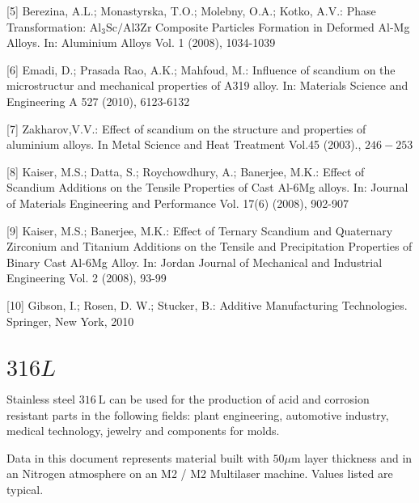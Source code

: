 \documentclass[10pt]{article}
\begin{document}
[5] Berezina, A.L.; Monastyrska, T.O.; Molebny, O.A.; Kotko, A.V.: Phase Transformation: $\mathrm{Al}_{3} \mathrm{Sc} / \mathrm{Al3Zr}$ Composite Particles Formation in Deformed Al-Mg Alloys. In: Aluminium Alloys Vol. 1 (2008), 1034-1039

[6] Emadi, D.; Prasada Rao, A.K.; Mahfoud, M.: Influence of scandium on the microstructur and mechanical properties of A319 alloy. In: Materials Science and Engineering A 527 (2010), 6123-6132

[7] Zakharov,V.V.: Effect of scandium on the structure and properties of aluminium alloys. In Metal Science and Heat Treatment Vol.45 (2003)., $246-253$

[8] Kaiser, M.S.; Datta, S.; Roychowdhury, A.; Banerjee, M.K.: Effect of Scandium Additions on the Tensile Properties of Cast Al-6Mg alloys. In: Journal of Materials Engineering and Performance Vol. 17(6) (2008), 902-907

[9] Kaiser, M.S.; Banerjee, M.K.: Effect of Ternary Scandium and Quaternary Zirconium and Titanium Additions on the Tensile and Precipitation Properties of Binary Cast Al-6Mg Alloy. In: Jordan Journal of Mechanical and Industrial Engineering Vol. 2 (2008), 93-99

[10] Gibson, I.; Rosen, D. W.; Stucker, B.: Additive Manufacturing Technologies. Springer, New York, 2010

\section*{$316 L$}
Stainless steel $316 \mathrm{~L}$ can be used for the production of acid and corrosion resistant parts in the following fields: plant engineering, automotive industry, medical technology, jewelry and components for molds.

Data in this document represents material built with $50 \mu \mathrm{m}$ layer thickness and in an Nitrogen atmosphere on an M2 / M2 Multilaser machine. Values listed are typical.
\end{document}
